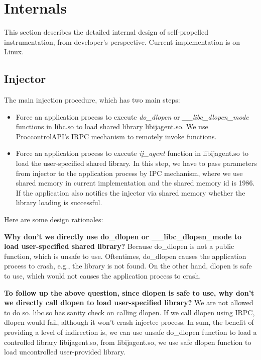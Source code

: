 \section{Internals}

This section describes the detailed internal design of self-propelled
instrumentation, from developer's perspective.
Current implementation is on Linux.

\subsection{Injector}

The main injection procedure, which has two main steps:
\begin{itemize}
\item Force an application process to execute {\em do\_dlopen} or {\em
    \_\_libc\_dlopen\_mode} functions in libc.so to load shared library
  libijagent.so. We use ProccontrolAPI's IRPC mechanism to remotely invoke
  functions.
\item Force an application process to execute {\em ij\_agent} function in
  libijagent.so to load the user-specified shared library. In this step, we have
  to pass parameters from injector to the application process by IPC mechanism,
  where we use shared memory in current implementation and the shared memory id
  is 1986. If the application also notifies the injector via shared memory
  whether the library loading is successful.
\end{itemize}

Here are some design rationales:

\textbf{Why don't we directly use do\_dlopen or \_\_libc\_dlopen\_mode to load
  user-specified shared library?}  Because do\_dlopen is not a public function,
which is unsafe to use.  Oftentimes, do\_dlopen causes the application process
to crash, e.g., the library is not found. On the other hand, dlopen is safe to
use, which would not causes the application process to crash.

\textbf{To follow up the above question, since dlopen is safe to use, why don't
  we directly call dlopen to load user-specified library?}  We are not allowed
to do so. libc.so has sanity check on calling dlopen. If we call dlopen using
IRPC, dlopen would fail, although it won't crash injectee process. In sum, the
benefit of providing a level of indirection is, we can use unsafe do\_dlopen
function to load a controlled library libijagent.so, from libijagent.so, we use
safe dlopen function to load uncontrolled user-provided library.


